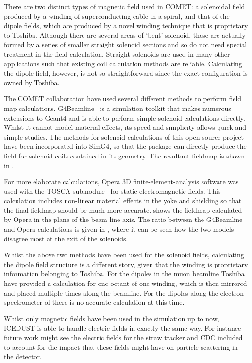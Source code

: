 There are two distinct types of magnetic field used in COMET: a solenoidal field produced by a winding of superconducting cable in a spiral, and that of the dipole fields, which are produced by a novel winding technique that
is proprietary to Toshiba.  
Although there are several areas of `bent' solenoid, these are actually formed by a series of smaller straight solenoid sections and so do not need special treatment in the field calculation.
Straight solenoids are used in many other applications such that existing coil calculation methods are reliable. 
Calculating the dipole field, however, is not so straightforward since the exact configuration is owned by Toshiba.

The COMET collaboration have used several different methods to perform field map calculations.
G4Beamline~\cite{G4Beamline} is a simulation toolkit that makes numerous extensions to Geant4 and is able to perform simple solenoid calculations directly.
Whilst it cannot model material effects, its speed and simplicity allows quick and simple studies. 
The methods for solenoid calculations of this open-source project have been incorporated into SimG4, so that the package can directly produce the field for solenoid coils contained in its geometry.
The resultant fieldmap is shown in .

For more elaborate calculations, Opera 3D finite-element-analysis software was used with the TOSCA submodule~\cite{Opera} for static electromagnetic fields.
This calculation includes non-linear material effects in the yoke and shielding so that the final fieldmap should be much more accurate.
 shows the fieldmap calculated by Opera in the plane of the beam line axis.
The ratio between the G4Beamline and Opera calculations is given in , where it can be seen how the two models disagree most at the exit of the solenoids.

Whilst the above two methods have been used for the solenoid fields, calculating the dipole field structure is a different story, given that the winding is proprietary information belonging to Toshiba.
For the dipoles in the muon beamline Toshiba have provided a calculation for one octant of one winding, which is then mirrored and placed multiple times along the beamline.
For the dipoles along the electron spectrometer of \phaseII there is no accurate calculation at this time.

Whilst only magnetic fields have been used in the simulation up to now, ICEDUST is able to handle electric fields in exactly the same way.
For instance future work might see the electric fields for the straw tracker and CDC included to account for the impact that these fields might have on particle scattering in the detector.

